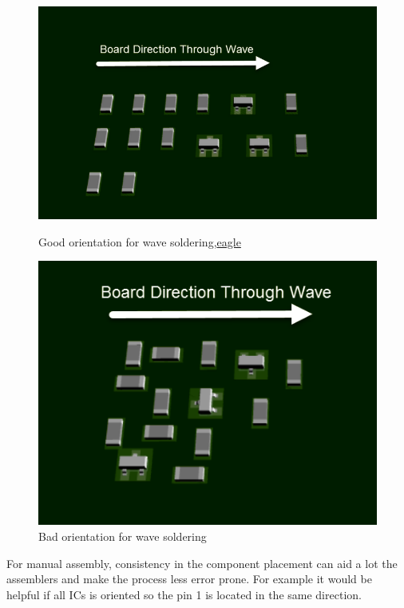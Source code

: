 \documentclass[final]{cubedoc}
\begin{document}
\begin{itemize}
		\begin{figure}[h!]
			\centering
			\begin{minipage}[b]{0.4\textwidth}
				\includegraphics[width=\textwidth]{assets/good_wave.png}
				\caption{Good orientation for wave soldering,\href{https://www.autodesk.com/products/eagle/blog/top-10-pcb-component-placement-tips-pcb-beginner/}{eagle}} 
			\end{minipage}
			\hfill
			\begin{minipage}[b]{0.4\textwidth}
				\includegraphics[width=\textwidth]{assets/bad_wave.png}
				\caption{Bad orientation for wave soldering}
			\end{minipage}
		\end{figure}
		
		For manual assembly, consistency in the component placement can aid a lot the assemblers and make the process less error prone. For example it would be helpful if all ICs is oriented so the pin 1 is located in the same direction.
		

\end{itemize}
\end{document}
